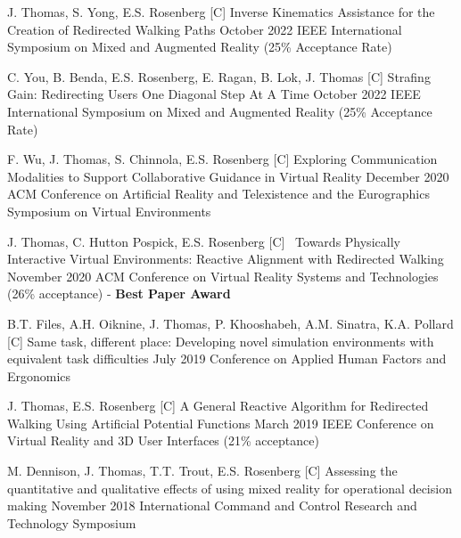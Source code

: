 \setcounter{npubs}{1}
\begin{cvpubs}
  \cvpub
    {J. Thomas, S. Yong, E.S. Rosenberg} %
    {[C\thenpubs] Inverse Kinematics Assistance for the Creation of Redirected Walking Paths} %
    {October 2022} %
    {IEEE International Symposium on Mixed and Augmented Reality (25\% Acceptance Rate)} %
      
  \cvpub
    {C. You, B. Benda, E.S. Rosenberg, E. Ragan, B. Lok, J. Thomas} %
    {[C\thenpubs] Strafing Gain: Redirecting Users One Diagonal Step At A Time} %
    {October 2022} %
    {IEEE International Symposium on Mixed and Augmented Reality (25\% Acceptance Rate)} %
    
  \cvpub
    {F. Wu, J. Thomas, S. Chinnola, E.S. Rosenberg} %
    {[C\thenpubs] Exploring Communication Modalities to Support Collaborative Guidance in Virtual Reality} %
    {December 2020} %
    {ACM Conference on Artificial Reality and Telexistence and the Eurographics Symposium on Virtual Environments}%
    
  \cvpub
    {J. Thomas, C. Hutton Pospick, E.S. Rosenberg} %
    {[C\thenpubs]\ \textcolor{awesome}{\faTrophy} Towards Physically Interactive Virtual Environments: Reactive Alignment with Redirected Walking} %
    {November 2020} %
    {ACM Conference on Virtual Reality Systems and Technologies (26\% acceptance) - \textbf{Best Paper Award}}
    
  \cvpub
    {B.T. Files, A.H. Oiknine, J. Thomas, P. Khooshabeh, A.M. Sinatra, K.A. Pollard} %
    {[C\thenpubs] Same task, different place: Developing novel simulation environments with equivalent task difficulties} %
    {July 2019} %
    {Conference on Applied Human Factors and Ergonomics} %
    
  \cvpub
    {J. Thomas, E.S. Rosenberg} %
    {[C\thenpubs] A General Reactive Algorithm for Redirected Walking Using Artificial Potential Functions} %
    {March 2019} %
    {IEEE Conference on Virtual Reality and 3D User Interfaces (21\% acceptance)}
    
  \cvpub
    {M. Dennison, J. Thomas, T.T. Trout, E.S. Rosenberg} %
    {[C\thenpubs] Assessing the quantitative and qualitative effects of using mixed reality for operational decision making} %
    {November 2018} %
    {International Command and Control Research and Technology Symposium} %
    

\end{cvpubs}
